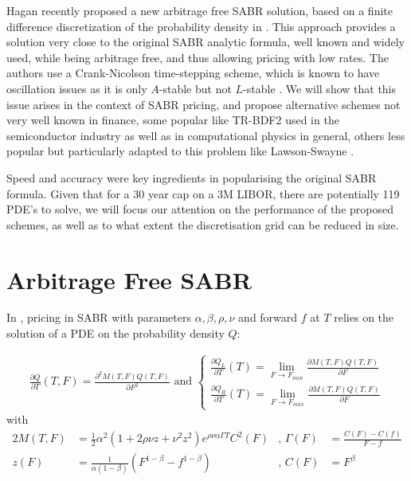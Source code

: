 \documentclass[]{rAMF2e}
\begin{document}
Hagan recently proposed a new arbitrage free SABR solution, based on a finite difference discretization of the probability density in \citep{hagan2013arbitrage}. This approach provides a solution very close to the original SABR analytic formula, well known and widely used, while being arbitrage free, and thus allowing pricing with low rates. The authors use a Crank-Nicolson time-stepping scheme, which is known to have oscillation issues \citep{duffy2004critique,GiCa2006} as it is only $A$-stable but not $L$-stable \citep{Le07}. We will show that this issue arises in the context of SABR pricing, and propose alternative schemes not very well known in finance, some popular like TR-BDF2 \citep{bank1985transient,bathe2005composite,edwards2011nonlinear, flavell2013conservative} used in the semiconductor industry as well as in computational physics in general, others less popular but particularly adapted to this problem like Lawson-Swayne \citep{lawson1976simple}.  

Speed and accuracy were key ingredients in popularising the original SABR formula. Given that for a 30 year cap on a 3M LIBOR, there are potentially 119 PDE's to solve, we will focus our attention on the performance of the proposed schemes, as well as to what extent the discretisation grid can be reduced in size.



\section{Arbitrage Free SABR}
In \citep{hagan2013arbitrage}, pricing in SABR with parameters $\alpha, \beta, \rho, \nu$ and forward $f$ at $T$ relies on the solution of a PDE on the probability density $Q$:

\begin{align}\label{eqn_pde}
\frac{\partial Q}{\partial T}(T,F) = \frac{\partial^2 M(T,F) Q(T,F)}{\partial F^2} \text{ and } \begin{cases}
\frac{\partial Q_L}{\partial T}(T) = \lim_{F \to F_{min}} \frac{\partial M(T,F) Q(T,F)}{\partial F}\\
\frac{\partial Q_R}{\partial T}(T) = \lim_{F \to F_{max}} \frac{\partial M(T,F) Q(T,F)}{\partial F}
\end{cases}
\end{align}
with
\begin{alignat}{2}
M(T,F) &= \frac{1}{2} \alpha^2 (1+2\rho\nu z+ \nu^2 z^2) e^{\rho\nu\alpha\Gamma T} C^2(F) &\text{, }
\Gamma(F) &= \frac{C(F)-C(f)}{F-f}\\
z(F) &= \frac{1}{\alpha (1-\beta)}(F^{1-\beta}-f^{1-\beta}) &\text{, }
C(F) &= F^{\beta} 
\end{alignat}
\end{document}
